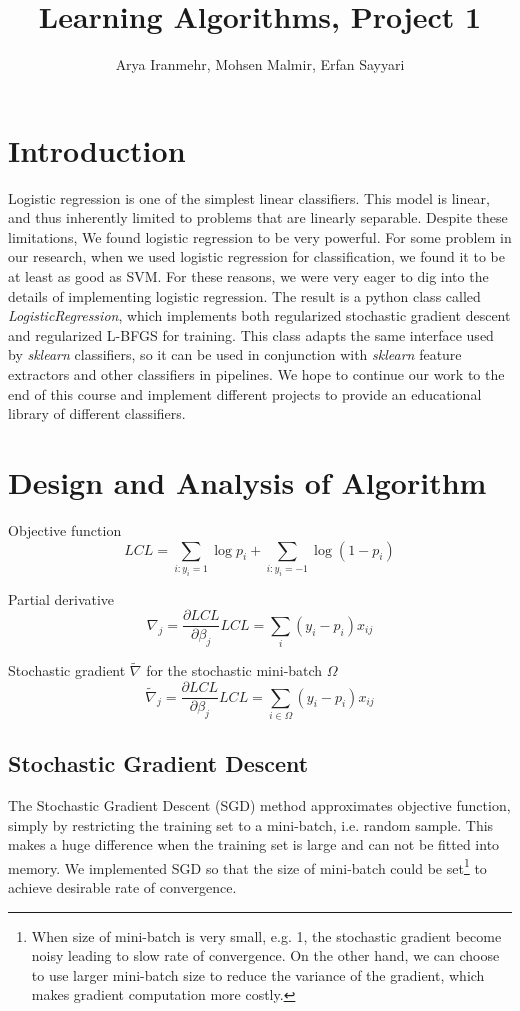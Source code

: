 \documentclass[twoside,12pt]{article}
\begin{document}
\title{Learning Algorithms, Project 1}
\author{Arya Iranmehr, Mohsen Malmir, Erfan Sayyari}
\maketitle

\section{Introduction}
Logistic regression is one of the simplest linear classifiers. This model is linear, and thus inherently limited to problems that are linearly separable. Despite these limitations, We found logistic regression to be very powerful. For some problem in our research, when we used logistic regression for classification, we found it to be at least as good as SVM. For these reasons, we were very eager to dig into the details of implementing logistic regression. The result is a python class called {\it LogisticRegression}, which implements both regularized stochastic gradient descent and regularized L-BFGS for training. This class adapts the same interface used by {\it sklearn} classifiers, so it can be used in conjunction with {\it sklearn} feature extractors and other classifiers  in  pipelines. We hope to continue our work to the end of this course and implement different projects to provide an educational library of different classifiers.
\section{Design and Analysis of Algorithm}
Objective function
\begin{equation}
LCL=\sum_{i:y_i=1} \log p_i +\sum_{i:y_i=-1} \log (1-p_i)
\label{eq:LCL}
\end{equation}

Partial derivative
\begin{equation}
\nabla_j=\frac{\partial LCL }{\partial \beta_j}LCL=\sum_{i} (y_i-p_i)x_{ij}
\label{eq:pLCL}
\end{equation}

Stochastic gradient $\tilde{\nabla}$ for the stochastic mini-batch $\Omega$
\begin{equation}
\tilde{\nabla}_j=\frac{\partial LCL }{\partial \beta_j}LCL=\sum_{i \in \Omega} (y_i-p_i)x_{ij}
\label{eq:pLCL}
\end{equation}
\subsection{Stochastic Gradient Descent}
The Stochastic Gradient Descent (SGD) method approximates objective function, simply by restricting the training set to a mini-batch, i.e. random sample. 
This makes a huge difference when the training set is large and can not be fitted into memory. We implemented SGD so that the size of mini-batch could be set\footnote{When size of mini-batch is very small, e.g. 1, the stochastic gradient become noisy leading to slow rate of convergence. On the other hand, we can choose to use larger mini-batch size to reduce the variance of the gradient, which makes gradient computation more costly.} to achieve desirable rate of convergence.
\end{document}
